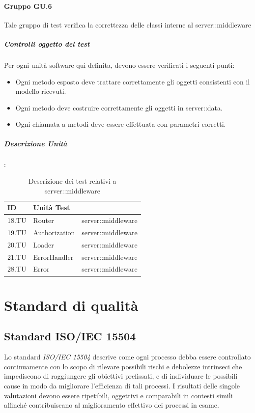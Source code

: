 \documentclass[12pt,a4paper]{article}
\begin{document}
\paragraph{Gruppo GU.6}
Tale gruppo di test verifica la correttezza delle classi interne al  server::middleware
\subparagraph{Controlli oggetto del test}
Per ogni unità software qui definita, devono essere verificati i seguenti punti:
\begin{itemize}
	\item Ogni metodo esposto deve trattare correttamente gli oggetti consistenti con il modello ricevuti.
	\item Ogni metodo deve costruire correttamente gli oggetti in server::data.
	\item Ogni chiamata a metodi deve essere effettuata con parametri corretti.
\end{itemize}
\subparagraph{Descrizione Unità}:
\begin{table}[H]
	\begin{center}
		\begin{tabular}{p{} p{} p{}}
			\toprule
			\textbf{ID}   & \textbf{Unità Test}	& \textbf{\mgls{package}} \\ \midrule
			\midrule
			18.TU & Router & server::middleware\\ \midrule
			19.TU & Authorization & server::middleware\\ \midrule
			20.TU & Loader & server::middleware\\ \midrule
			21.TU & ErrorHandler & server::middleware\\ \midrule
			28.TU & Error & server::middleware\\ \midrule			
			\bottomrule
		\end{tabular}
	\end{center}
	\caption{Descrizione dei test relativi a server::middleware}
\end{table}
\newpage
\section{Standard di qualità}\label{standard}
\subsection{Standard ISO/IEC 15504}
Lo standard \textit{ISO/IEC 15504} descrive come ogni processo debba essere controllato continuamente con lo scopo di rilevare possibili rischi e debolezze intrinseci che impediscono di raggiungere gli obiettivi prefissati, e di individuare le possibili cause in modo da migliorare l'efficienza di tali processi. I risultati delle singole valutazioni devono essere ripetibili, oggettivi e comparabili in contesti simili affinché contribuiscano al miglioramento effettivo dei processi in esame.
\end{document}
